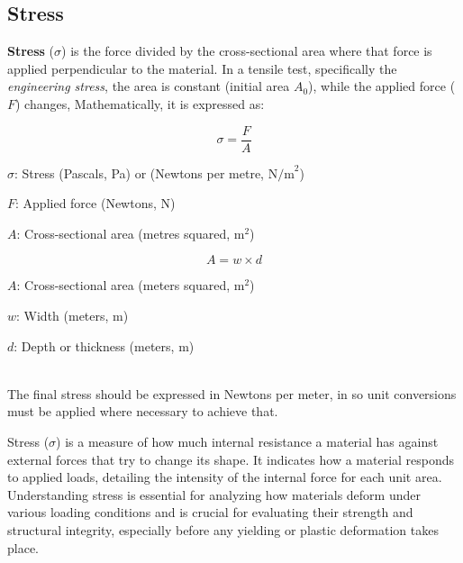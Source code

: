 \documentclass{article}
\newcommand{\wm}[1]{%
    \begin{minipage}{1\textwidth}
        #1
    \end{minipage}%
}
\begin{document}
     \subsection{Stress}
     \textbf{Stress} ($\sigma$) is the force divided by the cross-sectional area where that force is applied perpendicular to the material. In a tensile test, specifically the \textit{engineering stress}, the area is constant (initial area $A_0$), while the applied force ($F$) changes, Mathematically, it is expressed as:\\[8pt]
    \begin{minipage}{0.46\textwidth}
            \begin{equation}
                \sigma = \frac{F}{A}
                \label{eq:stress}
            \end{equation}
            \begin{itemize}[left=0pt,itemsep=-1mm]
            \wm{\item \(\sigma\): Stress (Pascals, Pa) or (Newtons per metre, \(\text{N/m}^2\))}
            \wm{\item \(F\): Applied force (Newtons, N)}
            \wm{\item \(A\): Cross-sectional area (metres squared, \(\text{m}^2\))}
            \end{itemize}
        \end{minipage}\hfill
        \begin{minipage}{0.47\textwidth}
            \begin{equation}
                A = w \times d
                \label{eq:csa}
            \end{equation}
            \begin{itemize}[left=0pt,itemsep=-1mm]
                \wm{\item \(A\): Cross-sectional area (meters squared, \(\text{m}^2\))}
                \wm{\item \(w\): Width (meters, \(\text{m}\))}
                \wm{\item \(d\): Depth or thickness (meters, \(\text{m}\))}            
            \end{itemize}
        \end{minipage}\\[8pt]
        The final stress should be expressed in Newtons per meter, in so unit conversions must be applied where necessary to achieve that.
        \newpage
        
        Stress ($\sigma$) is a measure of how much internal resistance a material has against external forces that try to change its shape. It indicates how a material responds to applied loads, detailing the intensity of the internal force for each unit area.\\[8pt]
        Understanding stress is essential for analyzing how materials deform under various loading conditions and is crucial for evaluating their strength and structural integrity, especially before any yielding or plastic deformation takes place.        
        
\end{document}
